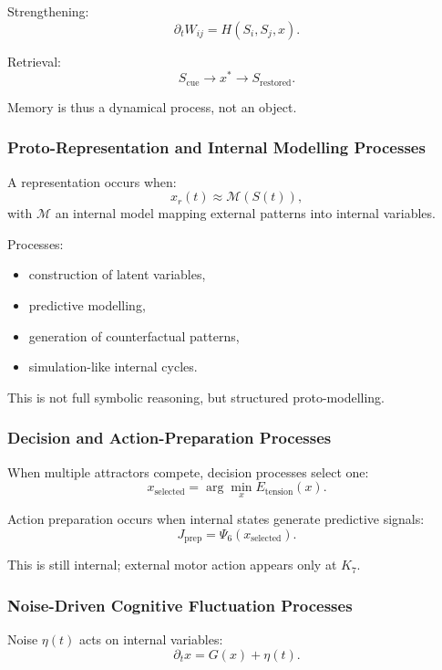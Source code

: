 Strengthening:
\[
\partial_t W_{ij} = H(S_i, S_j, x).
\]

Retrieval:
\[
S_{\text{cue}} \to x^\ast \to S_{\text{restored}}.
\]

Memory is thus a dynamical process, not an object.

\subsubsection{Proto-Representation and Internal Modelling Processes}

A representation occurs when:
\[
x_r(t) \approx \mathcal{M}(S(t)),
\]
with $\mathcal{M}$ an internal model mapping external patterns into
internal variables.

Processes:
\begin{itemize}
    \item construction of latent variables,
    \item predictive modelling,
    \item generation of counterfactual patterns,
    \item simulation-like internal cycles.
\end{itemize}

This is not full symbolic reasoning, but structured proto-modelling.

\subsubsection{Decision and Action-Preparation Processes}

When multiple attractors compete, decision processes select one:
\[
x_{\text{selected}} =
\arg\min_x E_{\text{tension}}(x).
\]

Action preparation occurs when internal states generate predictive
signals:
\[
J_{\text{prep}} = \Psi_6(x_{\text{selected}}).
\]

This is still internal; external motor action appears only at $K_7$.

\subsubsection{Noise-Driven Cognitive Fluctuation Processes}

Noise $\eta(t)$ acts on internal variables:
\[
\partial_t x = G(x) + \eta(t).
\]

